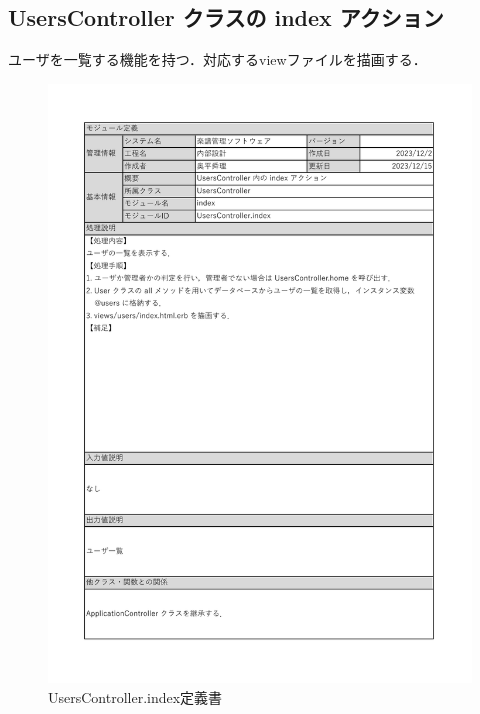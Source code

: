 \subsection*{UsersController クラスの index アクション}
ユーザを一覧する機能を持つ．対応するviewファイルを描画する．
\begin{figure}[H]
	\centering
	\includegraphics[scale=0.6]{img/Users/xlsx/UsersController_index.pdf}
	\vspace{-1cm}
	\caption{UsersController.index定義書}
\end{figure}

